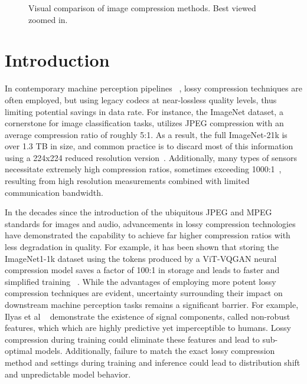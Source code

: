 \documentclass[10pt,twocolumn,letterpaper]{article}
\begin{document}
\begin{figure*}
\begin{center}
\end{center}
\caption{\label{fig:image_compression_methods}%
Visual comparison of image compression methods. Best viewed zoomed in.}
\end{figure*}


\section{Introduction}

In contemporary machine perception pipelines ~\cite{ehrlich2022first}, lossy compression techniques are often employed, but using legacy codecs at near-lossless quality levels, thus limiting potential savings in data rate. For instance, the ImageNet dataset, a cornerstone for image classification tasks, utilizes JPEG compression with an average compression ratio of roughly 5:1. As a result, the full ImageNet-21k is over 1.3 TB in size, and common practice is to discard most of this information using a 224x224 reduced resolution version~\cite{ridnikimagenet}. Additionally, many types of sensors necessitate extremely high compression ratios, sometimes exceeding 1000:1~\cite{cocker2022low}, resulting from high resolution measurements combined with limited communication bandwidth.

In the decades since the introduction of the ubiquitous JPEG and MPEG standards for images and audio, advancements in lossy compression technologies have demonstrated the capability to achieve far higher compression ratios with less degradation in quality. For example, it has been shown that storing the ImageNet1-1k dataset using the tokens produced by a ViT-VQGAN neural compression model saves a factor of 100:1 in storage and leads to faster and simplified training ~\cite{yu2021vector}\cite{park2023storage}. 
While the advantages of employing more potent lossy compression techniques are evident, uncertainty surrounding their impact on downstream machine perception tasks remains a significant barrier. For example, Ilyas et al ~\cite{ilyas2019adversarial} demonstrate the existence of signal components, called non-robust features, which which are highly predictive yet imperceptible to humans. Lossy compression during training could eliminate these features and lead to sub-optimal models. Additionally, failure to match the exact lossy compression method and settings during training and inference could lead to distribution shift and unpredictable model behavior.
\end{document}
